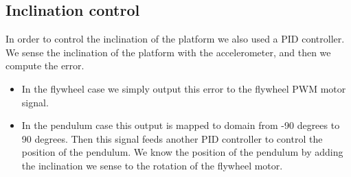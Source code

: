 \subsection{Inclination control}
In order to control the inclination of the platform we also used a PID controller.
We sense the inclination of the platform with the accelerometer, and then we compute the error.
\begin{itemize}
    \item In the flywheel case we simply output this error to the flywheel PWM motor signal.
    \item In the pendulum case this output is mapped to domain from -90 degrees to 90 degrees.
    Then this signal feeds another PID controller to control the position of the pendulum. We know
    the position of the pendulum by adding the inclination we sense to the rotation of the flywheel motor.
\end{itemize}
